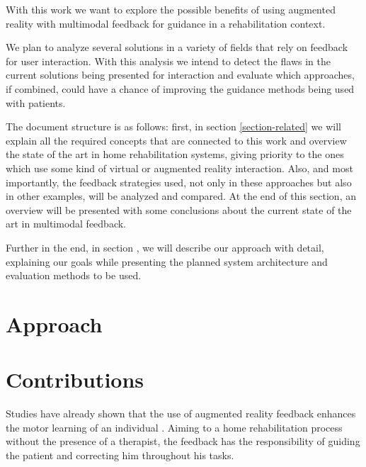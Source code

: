 
With this work we want to explore the possible benefits of using augmented reality with multimodal 
feedback for guidance in a rehabilitation context.

We plan to analyze several solutions in a variety of fields that rely on feedback for user interaction.
With this analysis we intend to detect the flaws in the current solutions being presented for interaction 
and evaluate which approaches, if combined, could have a chance of improving 
the guidance methods being used with patients.


The document structure is as follows: first, in section \ref{section-related} we will 
explain all the required concepts that are connected to 
this work and overview the state of the art in home rehabilitation systems, giving priority to 
the ones which use some kind of virtual or augmented reality interaction. Also, and most importantly, the feedback strategies used,
not only in these approaches but also in other examples, will be analyzed and compared. 
At the end of this section, an overview will be presented with some conclusions about the current state of the art in multimodal feedback.

Further in the end, in section %
, we will describe our approach with detail, explaining our goals 
while presenting the planned system architecture and evaluation methods to be used.


\section{Approach}




\section{Contributions}


Studies have already shown that the use of augmented reality feedback enhances the motor learning of an individual \cite{Sigrist2013}.
Aiming to a home rehabilitation process without the presence of a therapist,
the feedback has the responsibility of guiding the patient and correcting him throughout his tasks.

